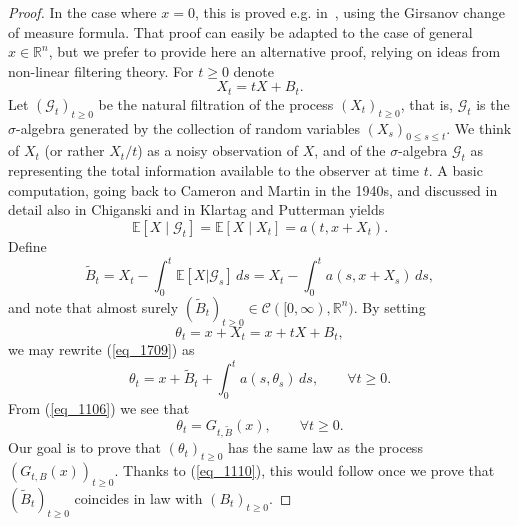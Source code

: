 \documentclass[12pt,a4paper]{article}
\newcommand{\EE}{\mathbb{E}}
\newcommand{\RR}{\mathbb{R}}
\newcommand{\cC}{\mathcal C}
\renewcommand{\tilde}{\widetilde}
\theoremstyle{definition}
\begin{document}
\begin{proof}
In the case where $x=0$, this is proved e.g. in~\cite[Proposition 6.7]{KLbull},
using the Girsanov change of measure formula. That proof can easily
be adapted to the case of general $x \in \RR^n$, but we prefer to provide
here an alternative proof, relying on ideas from non-linear filtering theory.
For $t \geq 0$ denote
\begin{equation} \label{eq_defXt}
X_t  = t X + B_t.
\end{equation}
Let $(\mathcal G_t)_{t \geq 0}$ be the natural filtration of the process $(X_t)_{t \geq 0}$,
that is, $\mathcal G_t$ is the $\sigma$-algebra generated by the collection
of random variables $(X_s)_{0 \leq s\leq t}$. 
We think of $X_t$ (or rather $X_t/t$)
as a noisy observation of  $X$, and of the $\sigma$-algebra $\mathcal G_t$ as representing the total information available to the observer at time $t$.
A basic computation, going back to Cameron and Martin \cite{CM} in the 1940s,
and discussed in detail also in Chiganski \cite[Example 6.15]{chigansky} and in Klartag and Putterman \cite[Section 4]{KP} yields
\begin{equation}
\EE \left[ X \mid \mathcal G_t  \right]
= \EE \left[ X \mid X_t  \right] = a(t, x + X_t).
\label{eq_1136}
\end{equation}
Define
\begin{equation}  \label{eq_1709}
\tilde B_t = X_t - \int_0^t  \EE[ X | \mathcal G_s ] \, ds
 = X_t - \int_0^t a(s, x + X_s ) \, ds,
\end{equation}
and note that almost surely  $(\tilde{B}_t)_{t \geq 0} \in \cC([0,\infty), \RR^n)$.
By setting 
\[
\theta_t = x + X_t = x + tX + B_t,
\]
we may rewrite (\ref{eq_1709}) as
\begin{equation} \label{eq_1106} 
\theta_t
= x + \tilde B_t + \int_0^t a(s, \theta_s ) \, ds , \qquad \forall t \geq 0.
\end{equation}
From (\ref{eq_1106}) we see that 
\begin{equation} 
\theta_t = G_{ t , \tilde B} (x), \qquad \forall t \geq 0. 
\label{eq_1110} \end{equation}
Our goal is to prove that $( \theta_t)_{t \geq 0}$
has the same law as the process $(G_{t, B} (x))_{t \geq 0}$.
Thanks to (\ref{eq_1110}), this would follow once we prove that $(\tilde B_t)_{t \geq 0}$ coincides in law with $(B_t)_{t \geq 0}$. 


\end{proof}
\end{document}
